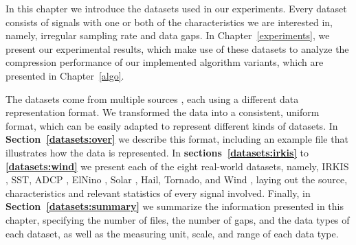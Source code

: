 




\newcommand{\BeCe}{B_c}


In this chapter we introduce the datasets used in our experiments. Every dataset consists of signals with one or both of the characteristics we are interested in, namely, irregular sampling rate and data gaps. In Chapter~\ref{experiments}, we present our experimental results, which make use of these datasets to analyze the compression performance of our implemented algorithm variants, which are presented in Chapter~\ref{algo}.


The datasets come from multiple sources \dataCite, each using a different data representation format. We transformed the data into a consistent, uniform format, which can be easily adapted to represent different kinds of datasets. In \textbf{Section~\ref{datasets:over}} we describe this format, including an example file that illustrates how the data is represented. In \textbf{sections~\ref{datasets:irkis}} to \textbf{\ref{datasets:wind}} we present each of the eight real-world datasets, namely, IRKIS \cite{dataset:irkis}, SST, ADCP \cite{dataset:sst1}, ElNino \cite{dataset:elnino}, Solar \cite{dataset:solar}, Hail, Tornado, and Wind \cite{dataset:spc}, laying out the source, characteristics and relevant statistics of every signal involved. Finally, in \textbf{Section~\ref{datasets:summary}} we summarize the information presented in this chapter, specifying the number of files, the number of gaps, and the data types of each dataset, as well as the measuring unit, scale, and range of each data type.

